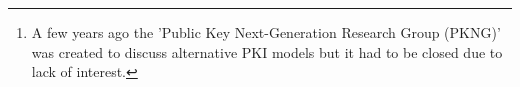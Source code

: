 \documentclass[a4paper]{scrreprt}
\begin{document}
\begin{abstract}
The authors would like to see the formation of an IETF or an IRTF working group\footnote{A few years ago the 'Public Key Next-Generation Research Group (PKNG)' \cite{PKNG} was created to discuss alternative PKI models but it had to be closed due to lack of interest.} to discuss the proposed experiments to reach a better understanding of the design constraints and goals that should be accomplished. We believe it is important to involve a broad range of stakeholders; it will be a prerequisite for the success. 
\end{abstract}


% 

\end{document}
